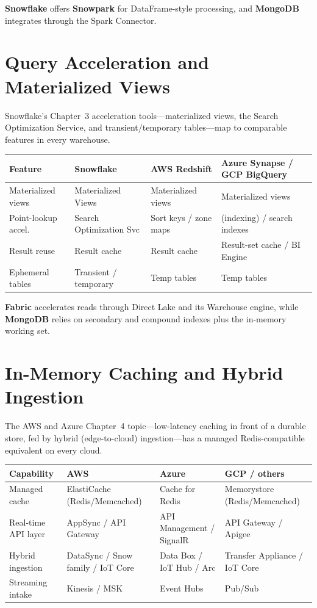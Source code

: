 \noindent \textbf{Snowflake} offers \textbf{Snowpark} for DataFrame-style processing, and
\textbf{MongoDB} integrates through the Spark Connector.

\section{Query Acceleration and Materialized Views}
%
Snowflake's Chapter~3 acceleration tools---materialized views, the Search Optimization Service, and
transient/temporary tables---map to comparable features in every warehouse.

\begin{center}
\footnotesize
\begin{tabular}{@{}p{2.8cm}p{3.0cm}p{3.0cm}p{3.4cm}@{}}
\toprule
\textbf{Feature} & \textbf{Snowflake} & \textbf{AWS Redshift} & \textbf{Azure Synapse / GCP BigQuery} \\
\midrule
Materialized views & Materialized Views & Materialized views & Materialized views \\
Point-lookup accel. & Search Optimization Svc & Sort keys / zone maps & (indexing) / search indexes \\
Result reuse & Result cache & Result cache & Result-set cache / BI Engine \\
Ephemeral tables & Transient / temporary & Temp tables & Temp tables \\
\bottomrule
\end{tabular}
\end{center}

\noindent \textbf{Fabric} accelerates reads through Direct Lake and its Warehouse engine, while
\textbf{MongoDB} relies on secondary and compound indexes plus the in-memory working set.

\section{In-Memory Caching and Hybrid Ingestion}
%
The AWS and Azure Chapter~4 topic---low-latency caching in front of a durable store, fed by hybrid
(edge-to-cloud) ingestion---has a managed Redis-compatible equivalent on every cloud.

\begin{center}
\footnotesize
\begin{tabular}{@{}p{2.8cm}p{3.0cm}p{3.0cm}p{3.4cm}@{}}
\toprule
\textbf{Capability} & \textbf{AWS} & \textbf{Azure} & \textbf{GCP / others} \\
\midrule
Managed cache & ElastiCache (Redis/Memcached) & Cache for Redis & Memorystore (Redis/Memcached) \\
Real-time API layer & AppSync / API Gateway & API Management / SignalR & API Gateway / Apigee \\
Hybrid ingestion & DataSync / Snow family / IoT Core & Data Box / IoT Hub / Arc & Transfer Appliance / IoT Core \\
Streaming intake & Kinesis / MSK & Event Hubs & Pub/Sub \\
\bottomrule
\end{tabular}
\end{center}

